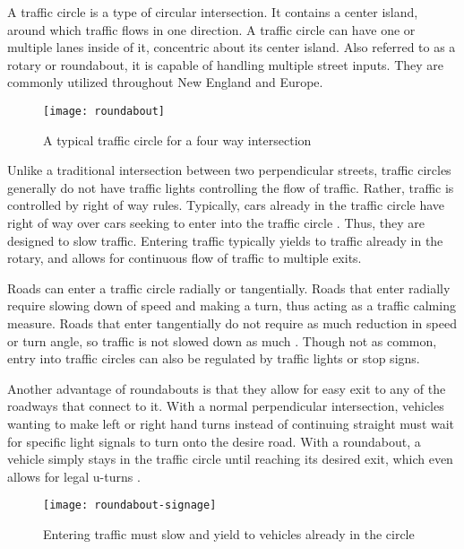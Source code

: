 A traffic circle is a type of circular intersection.  It contains a center island, around which traffic flows in one direction.  A traffic circle can have one or multiple lanes inside of it, concentric about its center island.  Also referred to as a rotary or roundabout, it is capable of handling multiple street inputs.  They are commonly utilized throughout New England and Europe.

\begin{figure}[!htbp]
\centering
\texttt{[image: roundabout]}
\caption{A typical traffic circle for a four way intersection\cite{rabout1}}\label{fig:roundabout}
\end{figure}

Unlike a traditional intersection between two perpendicular streets, traffic circles generally do not have traffic lights controlling the flow of traffic.  Rather, traffic is controlled by right of way rules.  Typically, cars already in the traffic circle have right of way over cars seeking to enter into the traffic circle \cite{rabout2}.  Thus, they are designed to slow traffic.  Entering traffic typically yields to traffic already in the rotary, and allows for continuous flow of traffic to multiple exits.

Roads can enter a traffic circle radially or tangentially. Roads that enter radially require slowing down of speed and making a turn, thus acting as a traffic calming measure.  Roads that enter tangentially do not require as much reduction in speed or turn angle, so traffic is not slowed down as much \cite{rabout3}.  Though not as common, entry into traffic circles can also be regulated by traffic lights or stop signs.  

Another advantage of roundabouts is that they allow for easy exit to any of the roadways that connect to it.  With a normal perpendicular intersection, vehicles wanting to make left or right hand turns instead of continuing straight must wait for specific light signals to turn onto the desire road.  With a roundabout, a vehicle simply stays in the traffic circle until reaching its desired exit, which even allows for legal u-turns \cite{rabout1}.

\begin{figure}[!htbp]
\centering
\texttt{[image: roundabout-signage]}
\caption[Roundabout Signage]{Entering traffic must slow and yield to vehicles already in the circle}\label{fig:roundabout-signage}
\end{figure}

